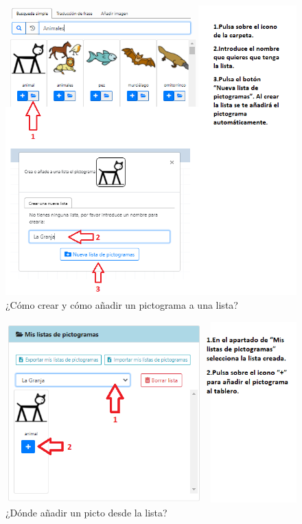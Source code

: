 \begin{figure}[h!]
	\centering
	\includegraphics[width=0.7\linewidth]{Imagenes/Bitmap/Tarea2-Pista2}
	\caption{¿Cómo crear y cómo añadir un pictograma a una lista?}
	\label{fig:tarea2-pista2}
\end{figure}

\begin{figure}[h!]
	\centering
	\includegraphics[width=0.7\linewidth]{Imagenes/Bitmap/Tarea2-Pista3}
	\caption{¿Dónde añadir un picto desde la lista?}
	\label{fig:tarea2-pista3}
\end{figure}


